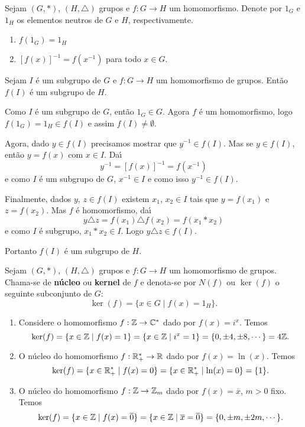 \begin{proposicao}
	Sejam $(G, *)$, $(H, \triangle)$ grupos e $f : G \to H$ um homomorfismo. Denote por $1_G$ e $1_H$ os elementos neutros de $G$ e $H$, respectivamente.
	\begin{enumerate}[label={\roman*})]
		\item $f(1_G) = 1_H$
		\item $[f(x)]^{-1} = f(x^{-1})$ para todo $x \in G$.
	\end{enumerate}
\end{proposicao}

\begin{proposicao}
	Sejam $I$ \'e um subgrupo de $G$ e $f : G \to H$ um homomorfismo de grupos. Ent\~ao $f(I)$ \'e um subgrupo de $H$.
\end{proposicao}
\begin{prova}
	Como $I$ \'e um subgrupo de $G$, ent\~ao $1_G \in G$. Agora $f$ \'e um homomorfismo, logo $f(1_G) = 1_H \in f(I)$ e assim $f(I) \ne \emptyset$.

	Agora, dado $y \in f(I)$ precisamos mostrar que $y^{-1} \in f(I)$. Mas se $y \in f(I)$, ent\~ao $y = f(x)$ com $x \in I$. Da{\'\i}
	\[
		y^{-1} = [f(x)]^{-1} = f(x^{-1})
	\]
	e como $I$ \'e um subgrupo de $G$, $x^{-1} \in I$ e como isso $y^{-1} \in f(I)$.

	Finalmente, dados $y$, $z \in f(I)$ existem $x_1$, $x_2 \in I$ tais que $y = f(x_1)$ e $z = f(x_2)$. Mas $f$ \'e homomorfismo, da{\'\i}
	\[
		y\triangle z = f(x_1)\triangle f(x_2) = f(x_1*x_2)
	\]
	e como $I$ \'e subgrupo, $x_1*x_2 \in I$. Logo $y\triangle z \in f(I)$.

	Portanto $f(I)$ \'e um subgrupo de $H$.
\end{prova}

\begin{definicao}
	Sejam $(G, *)$, $(H, \triangle)$ grupos e $f : G \to H$ um homomorfismo de grupos. Chama-se de \textbf{n\'ucleo} ou \textbf{kernel} de $f$ e denota-se por $N(f)$ ou $\ker(f)$ o seguinte subconjunto de $G$:
	\[
		\ker(f) = \{x \in G \mid f(x) = 1_H\}.
	\]
\end{definicao}

\begin{exemplos}
	\begin{enumerate}[label={\roman*})]
		\item Considere o homomorfismo $f : \mathbb{Z} \to \mathbb{C}^*$ dado por $f(x) = i^x$. Temos
		\[
			\ker(f) = \{x \in \mathbb{Z} \mid f(x) = 1\} = \{x \in \mathbb{Z} \mid i^x = 1\} = \{0, \pm 4, \pm 8, \cdots\} = 4\mathbb{Z}.
		\]

		\item O n\'ucleo do homomorfismo $f : \mathbb{R}^*_+ \to \mathbb{R}$ dado por $f(x) = \ln(x)$. Temos
		\[
			\ker(f) = \{x \in \mathbb{R}^*_+ \mid f(x) = 0\} = \{x \in \mathbb{R}^*_+ \mid \ln(x) = 0\} = \{1\}.
		\]

		\item O n\'ucleo do homomorfismo $f : \mathbb{Z} \to \mathbb{Z}_m$ dado por $f(x) = \overline{x}$, $m > 0$ fixo. Temos
		\[
			\ker(f) = \{x \in \mathbb{Z} \mid f(x) = \overline{0}\} = \{x \in \mathbb{Z} \mid \overline{x} = \overline{0}\} = \{0, \pm m, \pm 2m, \cdots\}.
		\]
	\end{enumerate}
\end{exemplos}

